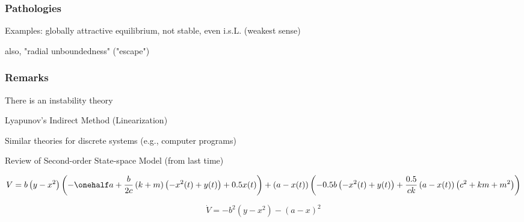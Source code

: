 \documentclass[12pt]{beamer}
\begin{document}
\begin{frame}
\frametitle{Pathologies}

Examples: globally attractive equilibrium, not stable, even i.s.L. (weakest sense)

also, "radial unboundedness" ("escape")

\end{frame}








\begin{frame}
\frametitle{Remarks}

There is an instability theory

Lyapunov's Indirect Method (Linearization)

Similar theories for discrete systems (e.g., computer programs)

\end{frame}




\begin{frame}{Review of Second-order State-space Model (from last time)}

\begin{equation}
V = b \left( y - x^{2}\right)
	\left(
		-\onehalf a + \frac{b}{2c} \left(k + m\right) \left(- x^{2}{\left (t \right )} + y{\left (t \right )}\right) + 0.5 x{\left (t \right )}\right)
		+ \left(a - x{\left (t \right )}\right) \left(- 0.5 b \left(- x^{2}{\left (t \right )} + y{\left (t \right )}\right) + \frac{0.5}{c k} \left(a - x{\left (t \right )}\right) \left(c^{2} + k m + m^{2}\right)\right)
\end{equation}

\begin{equation}
\dot V = -b^2 \left( y - x^2 \right) - \left( a - x \right)^2
\end{equation}

\end{frame}













\begin{frame}\end{frame}
\begin{frame}\end{frame}
\begin{frame}\end{frame}
\begin{frame}\end{frame}
\end{document}
